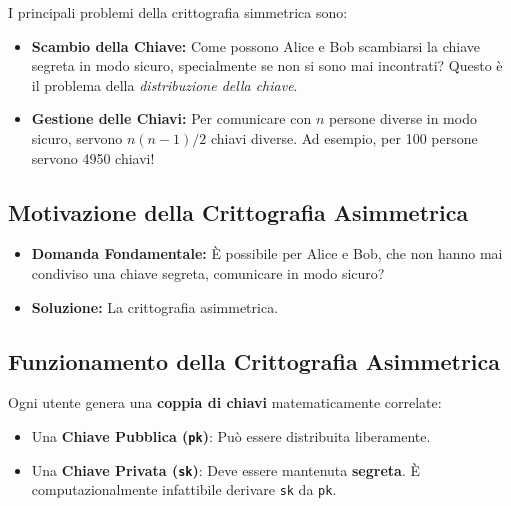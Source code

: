 I principali problemi della crittografia simmetrica sono:

\begin{itemize}
    \item \textbf{Scambio della Chiave:} Come possono Alice e Bob scambiarsi la chiave segreta in modo sicuro, specialmente se non si sono mai incontrati? Questo è il problema della \textit{distribuzione della chiave}.
    \item \textbf{Gestione delle Chiavi:} Per comunicare con $n$ persone diverse in modo sicuro, servono $n(n-1)/2$ chiavi diverse. Ad esempio, per 100 persone servono 4950 chiavi!
\end{itemize}

\subsection{Motivazione della Crittografia Asimmetrica}
\begin{itemize}
    \item \textbf{Domanda Fondamentale:} È possibile per Alice e Bob, che non hanno mai condiviso una chiave segreta, comunicare in modo sicuro?
    \item \textbf{Soluzione:} La crittografia asimmetrica.
\end{itemize}

\subsection{Funzionamento della Crittografia Asimmetrica}
Ogni utente genera una \textbf{coppia di chiavi} matematicamente correlate:
\begin{itemize}
    \item Una \textbf{Chiave Pubblica (\texttt{pk})}: Può essere distribuita liberamente.
    \item Una \textbf{Chiave Privata (\texttt{sk})}: Deve essere mantenuta \textbf{segreta}. È computazionalmente infattibile derivare \texttt{sk} da \texttt{pk}.
\end{itemize}


